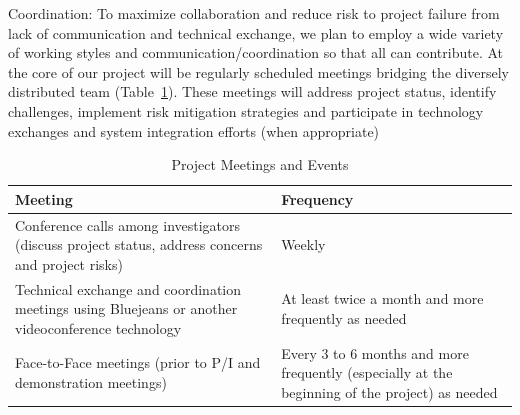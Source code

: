 \documentclass[12pt]{dod-blank}
\begin{document}
Coordination: To maximize collaboration and reduce risk to project failure from lack of communication and technical exchange, we plan to employ a wide variety of working styles and communication/coordination so that all can contribute.  At the core of our project will be regularly scheduled meetings bridging the diversely distributed team (Table~\ref{fig:Collaboration_Table}).  These meetings will address project status, identify challenges, implement risk mitigation strategies and participate in technology exchanges and system integration efforts (when appropriate)

\begin{table}[ht]
\caption{\small Project Meetings and Events}
  \centering
  {\footnotesize
\begin{tabular}{|m{3.15in}|m{3in}|} 
\hline
\textbf{Meeting} & \textbf{Frequency} 
\\\hline
Conference calls among investigators (discuss project status, address concerns and project risks) & Weekly
\\
\hline
Technical exchange and coordination meetings using Bluejeans or another videoconference technology & At least twice a month and more frequently as needed
  \\ 
\hline
Face-to-Face meetings (prior to P/I and demonstration meetings) & Every 3 to 6 months and more frequently (especially at the beginning of the project) as needed
 \\\cline{1-2}

\hline
\end{tabular}
}
\label{fig:Collaboration_Table}
\end{table}
\end{document}
